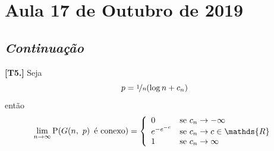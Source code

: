 { %

\delimitershortfall=-0.10pt

\newcommand{\given}{\,\middle|\,}               %

\newcommand{\Reals}{\mathds{R}}                 %

\newcommand{\defeq}{\vcentcolon=}               %
\newcommand{\eqdef}{=\vcentcolon}               %

\renewcommand{\l}{\mathopen{}\left}             %
\renewcommand{\r}{\vphantom{1j}\right}          %

\renewcommand{\P}{\mathrm{P}}                   %
\newcommand{\E}{\mathrm{E}}                     %
\newcommand{\e}{\mathrm{e}}                     %
\newcommand{\nf}{\nicefrac}                     %
\renewcommand{\d}{\cdot}                        %

\cleardoublepage
\section{Aula 17 de Outubro de 2019}
\label{2019_10_17}

\subsection*{\it Continuação}

\begin{teorema}
  \normalfont\textbf{[T5.]}
  Seja
  \vspace*{-\baselineskip}
  \[
    p = \nicefrac{1}{n}\l(\log n + c_n\r)
  \]
  então
  \vspace*{-\baselineskip}
  \[
    \lim_{n\rightarrow\infty} \P\l(G\l(n,\ p\r) \text{ é conexo}\r) = \l\{\begin{array}{ll}
      0                               & \text{se } c_n\rightarrow-\infty                            \\
      \mathrel{e}^{-\mathrel{e}^{-c}} & \text{se } c_n\rightarrow c\in\Reals                        \\
      1                               & \text{se } c_n\rightarrow\infty                             \\
    \end{array}\r.
  \]
\end{teorema}

}

